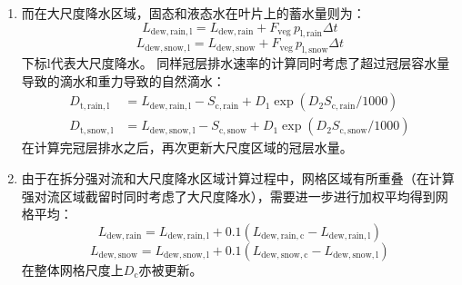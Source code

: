 \begin{enumerate}
  \item 而在大尺度降水区域，固态和液态水在叶片上的蓄水量则为：
    \begin{equation}
      L_\mathrm{dew,rain,l} = L_\mathrm{dew,rain} + F_\mathrm{veg}\,p_\mathrm{l,rain} \Delta t
    \end{equation}
    \begin{equation}
      L_\mathrm{dew,snow,l} = L_\mathrm{dew,snow} + F_\mathrm{veg}\,p_\mathrm{l,snow} \Delta t
    \end{equation}
    下标${\mathrm {l}}$代表大尺度降水。
    同样冠层排水速率的计算同时考虑了超过冠层容水量导致的滴水和重力导致的自然滴水：
      \begin{align}
      D_{\mathrm{t,rain,l}} &=L_{\mathrm{dew,rain,l}}-S_{\mathrm{c,rain}}+D_{1} \exp \left(D_{2} S_{\mathrm{c,rain}}/1000\right) \\[2.2ex]
      D_{\mathrm{t,snow,l}} &=L_{\mathrm{dew,snow,l}}-S_{\mathrm{c,snow}}+D_{1} \exp \left(D_{2} S_{\mathrm{c,snow}}/1000\right)
      \end{align}
    在计算完冠层排水之后，再次更新大尺度区域的冠层水量。

  \item 由于在拆分强对流和大尺度降水区域计算过程中，网格区域有所重叠（在计算强对流区域截留时同时考虑了大尺度降水），需要进一步进行加权平均得到网格平均：
%
    \begin{equation}
        L_{\mathrm{dew,rain}}  = L_{\mathrm{dew,rain,l}} + 0.1(L_{\mathrm{dew,rain,c}} - L_{\mathrm{dew,rain,l}}) 
    \end{equation}
    \begin{equation}
        L_{\mathrm{dew,snow}}  = L_{\mathrm{dew,snow,l}} + 0.1(L_{\mathrm{dew,snow,c}} - L_{\mathrm{dew,snow,l}}) 
    \end{equation}
%
    在整体网格尺度上$D_{\mathrm {c}} $亦被更新。

\end{enumerate}

